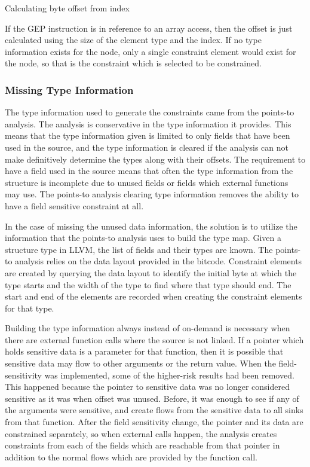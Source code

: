 \documentclass[11pt,a4paper]{article}
\begin{document}
\begin{algorithm}
  \caption{Calculating byte offset from index}
  \label{alg:find_offset}
  
\end{algorithm}

If the GEP instruction is in reference to an array access, then the offset is
just calculated using the size of the element type and the index. If no type
information exists for the node, only a single constraint element would exist
for the node, so that is the constraint which is selected to be constrained. 

\subsubsection{Missing Type Information}

The type information used to generate the constraints came from the points-to
analysis. The analysis is conservative in the type information it
provides. This means that the type information given is limited to only fields
that have been used in the source, and the type information is cleared if the
analysis can not make definitively determine the types along with their offsets.
The requirement to have a field used in the source means that often the type
information from the structure is incomplete due to unused fields or fields
which external functions may use. The points-to analysis clearing type
information removes the ability to have a field sensitive constraint at all.

In the case of missing the unused data information, the solution is to utilize
the information that the points-to analysis uses to build the type map. Given a
structure type in LLVM, the list of fields and their types are known. The
points-to analysis relies on the data layout provided in the bitcode. Constraint
elements are created by querying the data layout to identify the initial byte at
which the type starts and the width of the type to find where that type should
end. The start and end of the elements are recorded when creating the constraint
elements for that type.

Building the type information always instead of on-demand is necessary when
there are external function calls where the source is not linked. If a pointer
which holds sensitive data is a parameter for that function, then it is possible
that sensitive data may flow to other arguments or the return value. When the
field-sensitivity was implemented, some of the higher-risk results had been
removed. This happened because the pointer to sensitive data was no longer
considered sensitive as it was when offset was unused. Before, it was enough to
see if any of the arguments were sensitive, and create flows from the sensitive
data to all sinks from that function. After the field sensitivity change, the
pointer and its data are constrained separately, so when external calls happen,
the analysis creates constraints from each of the fields which are reachable
from that pointer in addition to the normal flows which are provided by the
function call.
\end{document}
